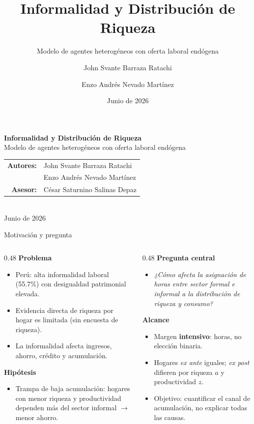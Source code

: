 \documentclass[aspectratio=169,11pt]{beamer}
\title{Informalidad y Distribuci\'on de Riqueza}
\subtitle{Modelo de agentes heterog\'eneos con oferta laboral end\'ogena}
\author{John Svante Barraza Ratachi \and Enzo Andr\'es Nevado Mart\'inez}
\institute{Asesor: C\'esar Saturnino Salinas Depaz}
\date{Junio de 2026}
\begin{document}
\begin{frame}[plain]
  \vspace{0.7cm}
  {\huge \textbf{Informalidad y Distribuci\'on de Riqueza}}\\[0.25cm]
  {\Large Modelo de agentes heterog\'eneos con oferta laboral end\'ogena}\\[0.9cm]
  \begin{tabular}{rl}
    \textbf{Autores:} & John Svante Barraza Ratachi \\
                      & Enzo Andr\'es Nevado Mart\'inez \\[0.15cm]
    \textbf{Asesor:} & C\'esar Saturnino Salinas Depaz
  \end{tabular}\\[0.6cm]
  {\large Junio de 2026}
\end{frame}

\begin{frame}{Motivaci\'on y pregunta}
  \begin{columns}[T,onlytextwidth]
    \begin{column}{0.48\textwidth}
      \textbf{Problema}
      \begin{itemize}
        \item Per\'u: alta informalidad laboral (55.7\%) con desigualdad patrimonial elevada.
        \item Evidencia directa de riqueza por hogar es limitada (sin encuesta de riqueza).
        \item La informalidad afecta ingresos, ahorro, cr\'edito y acumulaci\'on.
      \end{itemize}
      \vspace{0.2cm}
      \textbf{Hip\'otesis}
      \begin{itemize}
        \item Trampa de baja acumulaci\'on: hogares con menor riqueza y productividad dependen m\'as del sector informal $\rightarrow$ menor ahorro.
      \end{itemize}
    \end{column}
    \begin{column}{0.48\textwidth}
      \textbf{Pregunta central}
      \begin{itemize}
        \item \textit{¿C\'omo afecta la asignaci\'on de horas entre sector formal e informal a la distribuci\'on de riqueza y consumo?}
      \end{itemize}
      \vspace{0.2cm}
      \textbf{Alcance}
      \begin{itemize}
        \item Margen \textbf{intensivo}: horas, no elecci\'on binaria.
        \item Hogares \textit{ex ante} iguales; \textit{ex post} difieren por riqueza $a$ y productividad $z$.
        \item Objetivo: cuantificar el canal de acumulaci\'on, no explicar todas las causas.
      \end{itemize}
    \end{column}
  \end{columns}
\end{frame}
\end{document}

